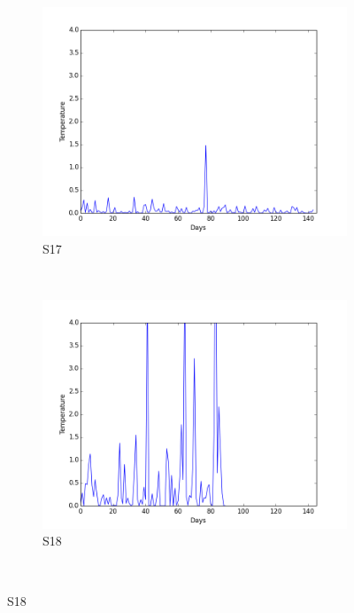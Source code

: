 \documentclass[12pt]{article} %
\begin{document}
\begin{figure}[H]
    \begin{subfigure}[b]{0.2\textwidth}
        \includegraphics[width=\textwidth]{img/graphs/17-gsr-1}
        \caption{S17}
        \label{fig:s17GSR}
    \end{subfigure}
    ~ %
    \begin{subfigure}[b]{0.2\textwidth}
        \includegraphics[width=\textwidth]{img/graphs/18-gsr-1}
        \caption{S18}
        \label{fig:s18GSR}
    \end{subfigure}
    ~ %

\end{figure}
\end{document}
